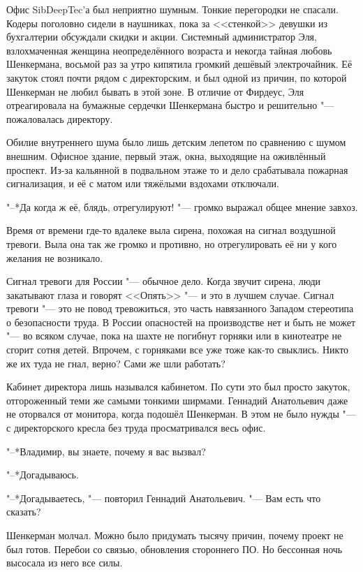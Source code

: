 Офис SibDeepTec'а был неприятно шумным.
Тонкие перегородки не спасали.
Кодеры поголовно сидели в наушниках, пока за <<стенкой>> девушки из бухгалтерии обсуждали скидки и акции.
Системный администратор Эля, взлохмаченная женщина неопределённого возраста и некогда тайная любовь Шенкермана, восьмой раз за утро кипятила громкий дешёвый электрочайник.
Её закуток стоял почти рядом с директорским, и был одной из причин, по которой Шенкерман не любил бывать в этой зоне.
В отличие от Фирдеус, Эля отреагировала на бумажные сердечки Шенкермана быстро и решительно "--- пожаловалась директору.

Обилие внутреннего шума было лишь детским лепетом по сравнению с шумом внешним.
Офисное здание, первый этаж, окна, выходящие на оживлённый проспект.
Из-за кальянной в подвальном этаже то и дело срабатывала пожарная сигнализация, и её с матом или тяжёлыми вздохами отключали.

"--*Да когда ж её, блядь, отрегулируют! "--- громко выражал общее мнение завхоз.

Время от времени где-то вдалеке выла сирена, похожая на сигнал воздушной тревоги.
Выла она так же громко и противно, но отрегулировать её ни у кого желания не возникало.

Сигнал тревоги для России "--- обычное дело.
Когда звучит сирена, люди закатывают глаза и говорят <<Опять>> "--- и это в лучшем случае.
Сигнал тревоги "--- это не повод тревожиться, это часть навязанного Западом стереотипа о безопасности труда.
В России опасностей на производстве нет и быть не может "--- во всяком случае, пока на шахте не погибнут горняки или в кинотеатре не сгорит сотня детей.
Впрочем, с горняками все уже тоже как-то свыклись.
Никто же их туда не гнал, верно?
Сами же шли работать?

Кабинет директора лишь назывался кабинетом.
По сути это был просто закуток, отгороженный теми же самыми тонкими ширмами.
Геннадий Анатольевич даже не оторвался от монитора, когда подошёл Шенкерман.
В этом не было нужды "--- с директорского кресла без труда просматривался весь офис.

"--*Владимир, вы знаете, почему я вас вызвал?

"--*Догадываюсь.

"--*Догадываетесь, "--- повторил Геннадий Анатольевич.
"--- Вам есть что сказать?

Шенкерман молчал.
Можно было придумать тысячу причин, почему проект не был готов.
Перебои со связью, обновления стороннего ПО.
Но бессонная ночь высосала из него все силы.

